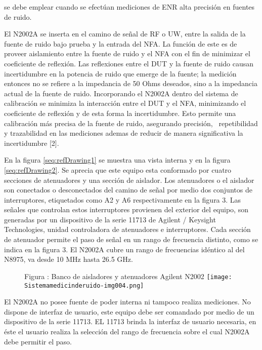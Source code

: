\documentclass[paper=letter,oneside,fontsize=10pt,parskip=full]{article}
\newcounter{Drawing}
\renewcommand\theDrawing{\arabic{Drawing}}
\begin{document}
se debe emplear cuando se efectúan mediciones de ENR alta precisión en fuentes de ruido.

El N2002A se inserta en el camino de señal de RF o UW, entre la salida de la fuente de ruido bajo prueba y la entrada
del NFA. La función de este es de proveer aislamiento entre la fuente de ruido y el NFA con el fin de minimizar el
coeficiente de reflexión. Las reflexiones entre el DUT y la fuente de ruido causan incertidumbre en la potencia de
ruido que emerge de la fuente; la medición entonces no se refiere a la impedancia de 50 Ohms deseados, sino a la
impedancia actual de la fuente de ruido. Incorporando el N2002A dentro del sistema de calibración se minimiza la
interacción entre el DUT y el NFA, minimizando el coeficiente de reflexión y de esta forma la incertidumbre. Esto
permite una calibración más precisa de la fuente de ruido, asegurando precisión, \ repetibilidad y trazabilidad en las
mediciones ademas de reducir de manera significativa la incertidumbre [2].

En la figura \ref{seq:refDrawing1} se muestra una vista interna y en la figura \ref{seq:refDrawing2}. Se aprecia que
este equipo esta conformado por cuatro secciones de atenuadores y una sección de aislador. Los atenuadores o el
aislador son conectados o desconectados del camino de señal por medio dos conjuntos de interruptores, etiquetados como
A2 y A6 respectivamente en la figura 3. Las señales que controlan estos interruptores provienen del exterior del
equipo, son generadas por un dispositivo de la serie 11713 de Agilent / Keysight Technologies, unidad controladora de
atenuadores e interruptores. Cada sección de atenuador permite el paso de señal en un rango de frecuencia distinto,
como se indica en la figura 3. El N2002A cubre un rango de frecuencias idéntico al del N8975, va desde 10 MHz hasta
26.5 GHz. 

\begin{figure}
\centering
\begin{minipage}{16.992cm}
Figura {\theDrawing\label{seq:refDrawing0}}: Banco de aisladores y atenuadores Agilent N2002
\texttt{[image: Sistemamedicinderuido-img004.png]}\end{minipage}
\end{figure}
El N2002A no posee fuente de poder interna ni tampoco realiza mediciones. No dispone de interfaz de usuario, este equipo
debe ser comandado por medio de un dispositivo de la serie 11713. EL 11713 brinda la interfaz de usuario necesaria, en
éste el usuario realiza la selección del rango de frecuencia sobre el cual N2002A debe permitir el paso.
\end{document}
